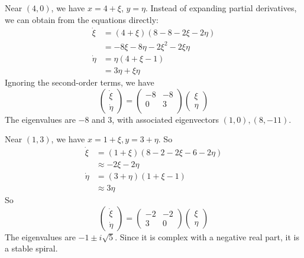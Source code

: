 \documentclass[a4paper]{article}
\begin{document}
\begin{eg}
\begin{center}
  \end{center}
  Near $(4, 0)$, we have $x = 4 + \xi$, $y = \eta$. Instead of expanding partial derivatives, we can obtain from the equations directly:
  \begin{align*}
    \dot\xi &= (4 + \xi)(8 - 8 - 2\xi - 2\eta)\\
    &= - 8\xi - 8\eta -2\xi^2 - 2\xi\eta\\
    \dot\eta &= \eta(4 + \xi - 1)\\
    &= 3\eta + \xi\eta
  \end{align*}
  Ignoring the second-order terms, we have
  \[
    \begin{pmatrix}
      \dot\xi\\\dot\eta
    \end{pmatrix} =
    \begin{pmatrix}
      -8 & -8 \\
      0 & 3\\
    \end{pmatrix}
    \begin{pmatrix}
      \xi\\\eta
    \end{pmatrix}
  \]
  The eigenvalues are $-8$ and $3$, with associated eigenvectors $(1, 0), (8, -11)$.
  \begin{center}
  \end{center}
  Near $(1, 3)$, we have $x = 1 + \xi, y = 3 + \eta$. So
  \begin{align*}
    \dot \xi &= (1 + \xi)(8 - 2 - 2\xi - 6 - 2\eta)\\
    &\approx -2\xi - 2\eta\\
    \dot\eta &= (3 + \eta)(1 + \xi - 1)\\
    &\approx 3\eta
  \end{align*}
  So
  \[
    \begin{pmatrix}
      \dot\xi\\\dot\eta
    \end{pmatrix} =
    \begin{pmatrix}
      -2 & -2\\
      3 & 0
    \end{pmatrix}
    \begin{pmatrix}
      \xi\\\eta
    \end{pmatrix}
  \]
  The eigenvalues are $- 1\pm i\sqrt{5}$. Since it is complex with a negative real part, it is a stable spiral.


\end{eg}
\end{document}
